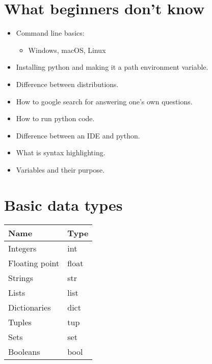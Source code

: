 \section{What beginners don't know}
\begin{itemize}
    \item Command line basics: 
        \begin{itemize}
            \item Windows, macOS, Linux 
        \end{itemize}
    
    \item Installing python and making it a path environment variable. 
    \item Difference between distributions.
    \item How to google search for answering one's own questions. 
    \item How to run python code. 
    \item Difference between an IDE and python. 
    \item What is syntax highlighting. 
    \item Variables and their purpose. 
\end{itemize}



\section{Basic data types}
\begin{center}
    \begin{tabular}{ |l|l| }
        \hline
            Name & Type  \\
        \hline
            Integers & int \\ 
        \hline
            Floating point & float \\ 
        \hline
            Strings & str \\ 
        \hline
            Lists & list \\ 
        \hline
            Dictionaries & dict \\ 
        \hline
            Tuples & tup \\ 
        \hline
            Sets & set \\ 
        \hline
            Booleans & bool \\ 
        \hline
    \end{tabular}
\end{center}


